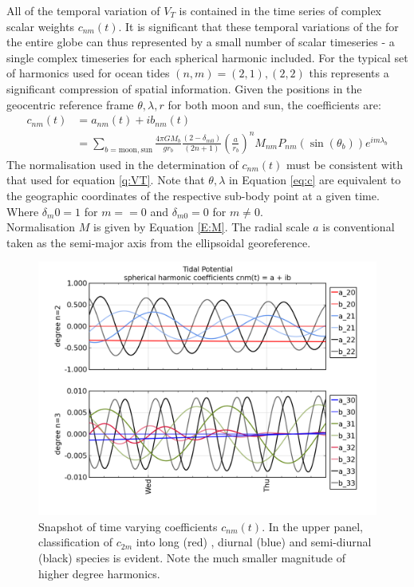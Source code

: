 All of the temporal variation of $V_T$ is contained in the time series of complex scalar weights $c_{nm}(t)$.
It is significant that these temporal variations of the \ATGP{} for the entire globe can thus represented by a small number of scalar timeseries - a single complex timeseries for each spherical harmonic included.  For the typical set of harmonics used for ocean tides $(n,m)=(2,1),(2,2)$ this represents a significant compression of spatial information.  
Given the positions in the geocentric reference frame $\theta,\lambda,r$ for both moon and sun, the coefficients are:
\begin{align}
\label{eq:c}
c_{nm}(t) &= a_{nm}(t) + ib_{nm}(t) \nonumber \\
          &= \sum_{b=\text{moon},\text{sun}}    \frac{4 \pi GM_{b}}{g r_{b}}  \frac{(2-\delta_{m0})} {(2n+1)} \left(\frac{a}{r_b} \right)^n    M_{nm} P_{nm}( \sin(\theta_b) ) e^{im\lambda_b}
\end{align}
The normalisation used in the determination of $c_{nm}(t)$ must be consistent with that used for equation \ref{q:VT}.
Note that $\theta,\lambda$ in Equation \ref{eq:c} are equivalent to the geographic coordinates of the respective sub-body point at a given time. 
Where $\delta_m0 = 1$ for $m==0$ and $\delta_{m0} = 0$ for $m \neq 0$.\\
Normalisation $M$ is given by Equation \ref{E:M}. The radial scale $a$ is conventional taken as the semi-major axis from the ellipsoidal georeference. 
\begin{figure}[h]
\begin{center}
\includegraphics[width=\figwidthBig]{figures/plots/tidal_coeff_timeseries_2days.png}
\caption{Snapshot of time varying coefficients $c_{nm}(t)$.  In the upper panel, classification of $c_{2m}$ into long (red) , diurnal (blue) and semi-diurnal (black) species is evident.  Note the much smaller magnitude of higher degree harmonics.}
\end{center}
\end{figure}
